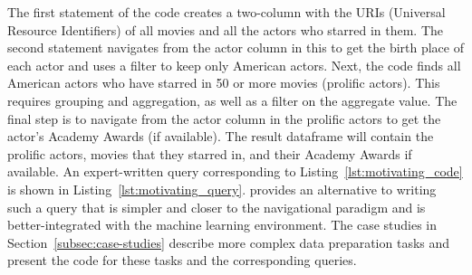 The first statement of the code creates a two-column
\rdfframe with 
the URIs (Universal Resource Identifiers) of
all movies and all the actors who starred in them.
The second statement navigates from the actor column in this 
\rdfframe to get the birth place of each actor and uses a filter
to keep only American actors.
Next, the code finds all American actors who have starred
in 50 or more movies (prolific actors).
This requires grouping and aggregation, as well as a filter 
on the aggregate value.
The final step is to navigate from the actor column in the prolific actors 
\rdfframe to get the actor's Academy Awards (if available).
The result dataframe will contain the prolific actors, movies that they starred in, and their Academy Awards if available.
An expert-written \sparql query corresponding to Listing~\ref{lst:motivating_code} is shown in Listing~\ref{lst:motivating_query}.
\rdfframes provides an alternative to writing such a \sparql
query that is simpler and closer to the navigational paradigm and is
better-integrated with the machine learning environment.
The case studies in Section~\ref{subsec:case-studies} describe 
more complex data preparation tasks and present the
\rdfframes code for these tasks and the corresponding
\sparql queries.


